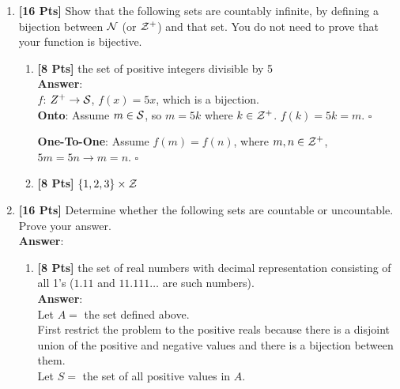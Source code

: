 \documentclass[11pt]{article}
\begin{document}
\begin{enumerate}

\item {\bf [16 Pts]} Show that the following sets are countably 
  infinite, by defining a bijection between $\cal N$ (or $\cal Z^+$) and that
  set. You do not need to prove that your function is bijective.

\begin{enumerate}

\item {\bf [8 Pts]} the set of positive integers divisible by 5\\
\textbf{Answer}:\\

$f$: $Z^+ \rightarrow \cal S$, $f(x) = 5x$, which is a bijection.\\

\textbf{Onto}: Assume $m \in \cal S$, so $m = 5k$ where $k \in \cal Z^+$. $f(k) = 5k = m$. $\square$

\textbf{One-To-One}: Assume $f(m) = f(n)$, where $m, n \in \cal Z^+$, $5m = 5n \rightarrow m = n$. $\square$\\

\item {\bf [8 Pts]} $\{1,2,3\} \times {\cal Z}$

\end{enumerate}

\item {\bf [16 Pts]} Determine whether the following sets are countable or
  uncountable. Prove your answer.\\
\textbf{Answer}:\\



\begin{enumerate}

\item {\bf [8 Pts]} the set of real numbers with decimal representation
  consisting of all 1's ($1.11$ and $11.111 \ldots$ are such numbers).\\
\textbf{Answer}:\\

Let $A = $ the set defined above.\\

First restrict the problem to the positive reals because there is a disjoint union of the positive and negative values and there is a bijection between them.\\

Let $S = $ the set of all positive values in $A$.\\\\


\end{enumerate}
\end{enumerate}
\end{document}
